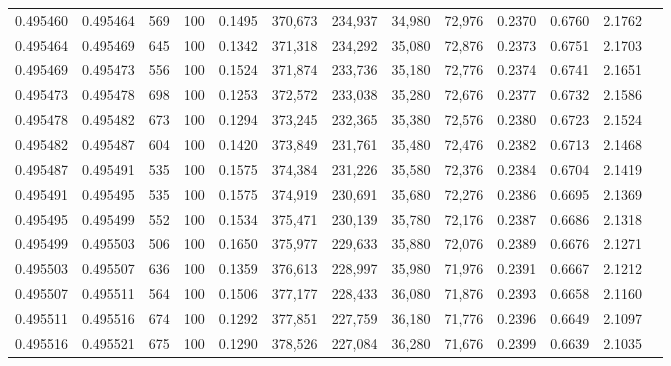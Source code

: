 \begin{tabular}{rrrrrrrrrrrrr}
0.495460 & 0.495464 &   569 & 100 &                                     0.1495 & 370,673 & 234,937 &  34,980 &  72,976 & 0.2370 & 0.6760 & 2.1762 \\
0.495464 & 0.495469 &   645 & 100 &                                     0.1342 & 371,318 & 234,292 &  35,080 &  72,876 & 0.2373 & 0.6751 & 2.1703 \\
0.495469 & 0.495473 &   556 & 100 &                                     0.1524 & 371,874 & 233,736 &  35,180 &  72,776 & 0.2374 & 0.6741 & 2.1651 \\
0.495473 & 0.495478 &   698 & 100 &                                     0.1253 & 372,572 & 233,038 &  35,280 &  72,676 & 0.2377 & 0.6732 & 2.1586 \\
0.495478 & 0.495482 &   673 & 100 &                                     0.1294 & 373,245 & 232,365 &  35,380 &  72,576 & 0.2380 & 0.6723 & 2.1524 \\
0.495482 & 0.495487 &   604 & 100 &                                     0.1420 & 373,849 & 231,761 &  35,480 &  72,476 & 0.2382 & 0.6713 & 2.1468 \\
0.495487 & 0.495491 &   535 & 100 &                                     0.1575 & 374,384 & 231,226 &  35,580 &  72,376 & 0.2384 & 0.6704 & 2.1419 \\
0.495491 & 0.495495 &   535 & 100 &                                     0.1575 & 374,919 & 230,691 &  35,680 &  72,276 & 0.2386 & 0.6695 & 2.1369 \\
0.495495 & 0.495499 &   552 & 100 &                                     0.1534 & 375,471 & 230,139 &  35,780 &  72,176 & 0.2387 & 0.6686 & 2.1318 \\
0.495499 & 0.495503 &   506 & 100 &                                     0.1650 & 375,977 & 229,633 &  35,880 &  72,076 & 0.2389 & 0.6676 & 2.1271 \\
0.495503 & 0.495507 &   636 & 100 &                                     0.1359 & 376,613 & 228,997 &  35,980 &  71,976 & 0.2391 & 0.6667 & 2.1212 \\
0.495507 & 0.495511 &   564 & 100 &                                     0.1506 & 377,177 & 228,433 &  36,080 &  71,876 & 0.2393 & 0.6658 & 2.1160 \\
0.495511 & 0.495516 &   674 & 100 &                                     0.1292 & 377,851 & 227,759 &  36,180 &  71,776 & 0.2396 & 0.6649 & 2.1097 \\
0.495516 & 0.495521 &   675 & 100 &                                     0.1290 & 378,526 & 227,084 &  36,280 &  71,676 & 0.2399 & 0.6639 & 2.1035 \\

\end{tabular}
